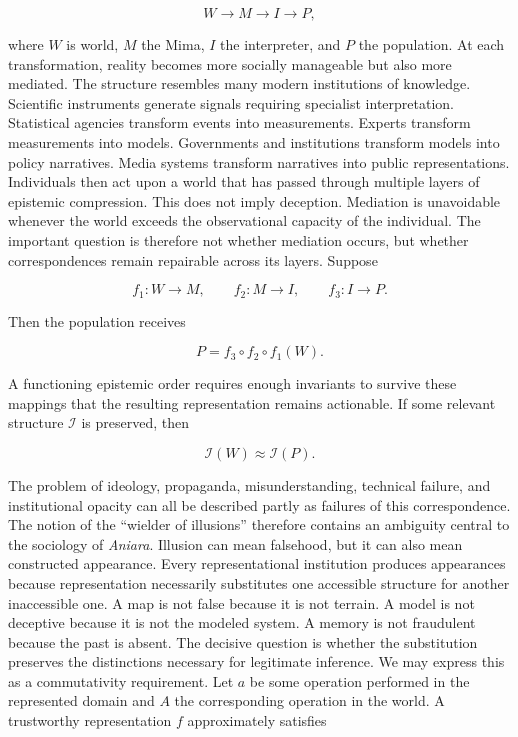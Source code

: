 \documentclass[11pt,oneside]{book}
\theoremstyle{definition}
\theoremstyle{remark}
\begin{document}
\[
W \longrightarrow M \longrightarrow I \longrightarrow P,
\]

where \(W\) is world, \(M\) the Mima, \(I\) the interpreter, and \(P\) the population. At each
transformation, reality becomes more socially manageable but also more mediated. The structure
resembles many modern institutions of knowledge. Scientific instruments generate signals requiring
specialist interpretation. Statistical agencies transform events into measurements. Experts
transform measurements into models. Governments and institutions transform models into policy
narratives. Media systems transform narratives into public representations. Individuals then act
upon a world that has passed through multiple layers of epistemic compression. This does not imply
deception. Mediation is unavoidable whenever the world exceeds the observational capacity of the
individual. The important question is therefore not whether mediation occurs, but whether
correspondences remain repairable across its layers. Suppose

\[
f_1:W\rightarrow M, \qquad f_2:M\rightarrow I, \qquad f_3:I\rightarrow P.
\]

Then the population receives

\[
P=f_3\circ f_2\circ f_1(W).
\]

A functioning epistemic order requires enough invariants to survive these mappings that the
resulting representation remains actionable. If some relevant structure \(\mathcal{I}\) is
preserved, then

\[
\mathcal{I}(W) \approx \mathcal{I}(P).
\]

The problem of ideology, propaganda, misunderstanding, technical failure, and institutional opacity
can all be described partly as failures of this correspondence. The notion of the ``wielder of
illusions'' therefore contains an ambiguity central to the sociology of \emph{Aniara}. Illusion can
mean falsehood, but it can also mean constructed appearance. Every representational institution
produces appearances because representation necessarily substitutes one accessible structure for
another inaccessible one. A map is not false because it is not terrain. A model is not deceptive
because it is not the modeled system. A memory is not fraudulent because the past is absent. The
decisive question is whether the substitution preserves the distinctions necessary for legitimate
inference. We may express this as a commutativity requirement. Let \(a\) be some operation performed
in the represented domain and \(A\) the corresponding operation in the world. A trustworthy
representation \(f\) approximately satisfies
\end{document}
